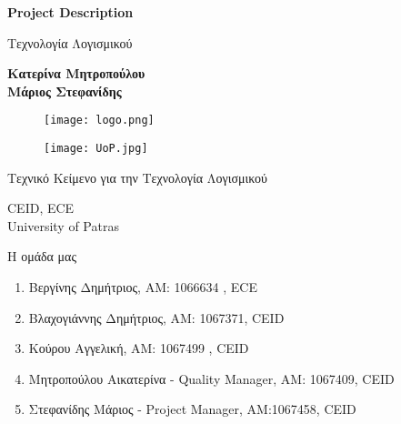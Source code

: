 \documentclass{article}
\begin{document}

\begin{titlepage}
   \begin{center}
       \vspace*{1cm}

       \textbf{\huge Project Description}

       \vspace{0.5cm}
        Τεχνολογία Λογισμικού
            
       \vspace{1cm}

       \textbf{Κατερίνα Μητροπούλου\\Μάριος Στεφανίδης}
       
       \begin{figure}[!htb]
        \centering
        \texttt{[image: logo.png]}
        \end{figure}
        
        \vspace{0.5cm}
        
        \begin{figure}[!htb]
        \centering
        \texttt{[image: UoP.jpg]}
        \end{figure}


       \vfill
            
       Τεχνικό Κείμενο για την Τεχνολογία Λογισμικού\\
            
       \vspace{0.5cm}
            
       CEID, ECE\\
       University of Patras\\
            
   \end{center}
\end{titlepage}



\noindent Η ομάδα μας

\begin{enumerate}
  \item Βεργίνης Δημήτριος, ΑΜ: 1066634 , ECE
  \item Βλαχογιάννης Δημήτριος, ΑΜ: 1067371, CEID
  \item Κούρου Αγγελική, ΑΜ: 1067499 , CEID
  \item Μητροπούλου Αικατερίνα - Quality Manager, ΑΜ: 1067409, CEID
  \item Στεφανίδης Μάριος - Project Manager, ΑΜ:1067458, CEID
\end{enumerate}
\end{document}
